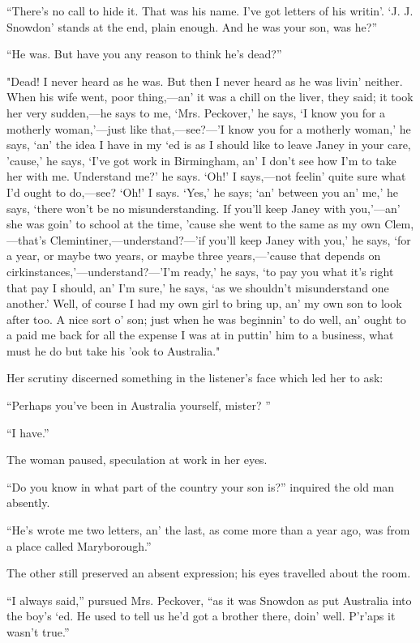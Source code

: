 {}``There's no call to hide it. That was his name. I've got letters of
his writin'. `J. J. Snowdon' stands at the end, plain enough. And he was
your son, was he?''

``He was. But have you any reason to think he's dead?''

"Dead! I never heard as he was. But then I never heard as he was livin'
neither. When his wife went, poor thing,---an' it was a chill on the
liver, they said; it took her very sudden,---he says to me, `Mrs.
Peckover,' he says, `I know you for a motherly woman,'---just like
that,---see?---'I know you for a motherly woman,' he says, `an' the idea
I have in my `ed is as I should like to leave Janey in your care,
'cause,' he says, `I've got work in Birmingham, an' I don't see how I'm
to take her with me. Understand me?' he says. `Oh!' I says,---not
feelin' quite sure what I'd ought to do,---see? `Oh!' I says. `Yes,' he
says; `an' between you an' me,' he says, `there won't be no
misunderstanding. If you'll keep Janey with you,'---an' she was goin' to
school at the time, 'cause {}she went to the same as my own
Clem,---that's Clemintiner,---understand?---'if you'll keep Janey with
you,' he says, `for a year, or maybe two years, or maybe three
years,---'cause that depends on cirkinstances,'---understand?---'I'm
ready,' he says, `to pay you what it's right that pay I should, an' I'm
sure,' he says, `as we shouldn't misunderstand one another.' Well, of
course I had my own girl to bring up, an' my own son to look after too.
A nice sort o' son; just when he was beginnin' to do well, an' ought to
a paid me back for all the expense I was at in puttin' him to a
business, what must he do but take his 'ook to Australia."

Her scrutiny discerned something in the listener's face which led her to
ask:

``Perhaps you've been in Australia yourself, mister? ''

``I have.''

The woman paused, speculation at work in her eyes.

``Do you know in what part of the country your son is?'' inquired the
old man absently.

{}``He's wrote me two letters, an' the last, as come more than a year
ago, was from a place called Maryborough.''

The other still preserved an absent expression; his eyes travelled about
the room.

``I always said,'' pursued Mrs. Peckover, ``as it was Snowdon as put
Australia into the boy's `ed. He used to tell us he'd got a brother
there, doin' well. P'r'aps it wasn't true.''

